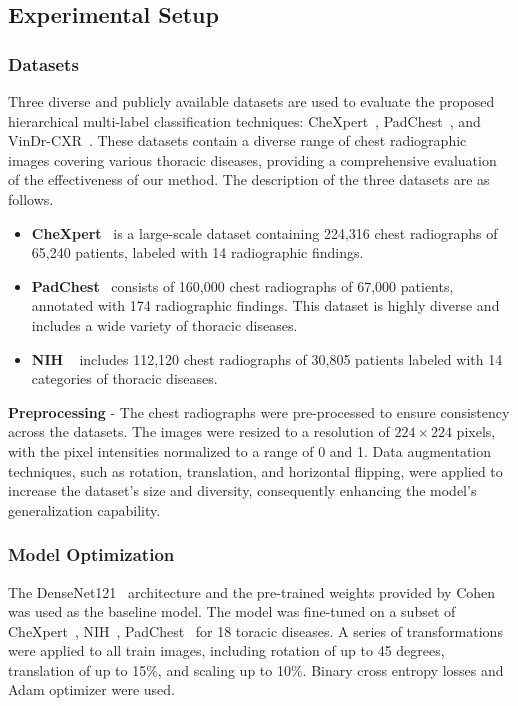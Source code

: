 \subsection{Experimental Setup}
\subsubsection{Datasets}
Three diverse and publicly available datasets are used  to evaluate the proposed hierarchical multi-label classification techniques: CheXpert~\cite{irvin_CheXpert_2019}, PadChest~\cite{bustos_Padchest_2020}, and VinDr-CXR~\cite{nguyen_VinDrCXR_2022}. These datasets contain a diverse range of chest radiographic images covering various thoracic diseases, providing a comprehensive evaluation of the effectiveness of our method. The description of the three datasets are as follows.
\begin{itemize}
    \item  \textbf{CheXpert}~\cite{irvin_CheXpert_2019} is a large-scale dataset containing 224,316 chest radiographs of 65,240 patients, labeled with 14 radiographic findings.
    \item \textbf{PadChest}~\cite{bustos_Padchest_2020} consists of 160,000 chest radiographs of 67,000 patients, annotated with 174 radiographic findings. This dataset is highly diverse and includes a wide variety of thoracic diseases.
    \item \textbf{NIH }~\cite{wang_ChestXRay8_2017} includes 112,120 chest radiographs of 30,805 patients labeled with 14 categories of thoracic diseases.
\end{itemize}

\textbf{Preprocessing} - The chest radiographs were pre-processed to ensure consistency across the datasets. The images were resized to a resolution of $224 \times 224$ pixels, with the pixel intensities normalized to a range of 0 and 1. Data augmentation techniques, such as rotation, translation, and horizontal flipping, were applied to increase the dataset's size and diversity, consequently enhancing the model's generalization capability.

\subsubsection{Model Optimization}
The DenseNet121~\cite{huang_Densely_2017} architecture and the pre-trained weights provided by Cohen~\cite{cohen_TorchXRayVision_2022} was used as the baseline model. The model was fine-tuned on a subset of CheXpert~\cite{irvin_CheXpert_2019}, NIH~\cite{wang_ChestXRay8_2017}, PadChest~\cite{bustos_Padchest_2020} for 18 toracic diseases. A series of transformations were applied to all train images, including rotation of up to 45 degrees, translation of up to 15\%, and scaling up to 10\%. Binary cross entropy losses and Adam optimizer were used.

